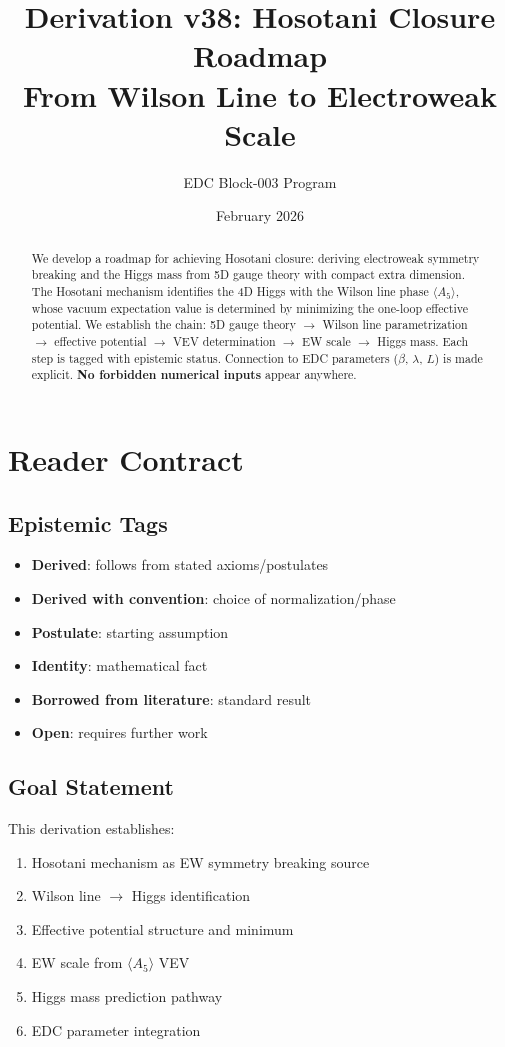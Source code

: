 \documentclass[11pt,a4paper]{article}
\title{\textbf{Derivation v38: Hosotani Closure Roadmap} \\[0.5em]
\large From Wilson Line to Electroweak Scale}
\author{EDC Block-003 Program}
\date{February 2026}
\newcommand{\tagD}{\textcolor{blue!70!black}{[D]}}
\newcommand{\tagDc}{\textcolor{blue!50!black}{[Dc]}}
\newcommand{\tagP}{\textcolor{green!50!black}{[P]}}
\newcommand{\tagI}{\textcolor{gray}{[I]}}
\newcommand{\tagBL}{\textcolor{purple}{[BL]}}
\newcommand{\tagOPEN}{\textcolor{red!70!black}{[OPEN]}}
\begin{document}
\maketitle

\begin{abstract}
We develop a roadmap for achieving Hosotani closure: deriving electroweak
symmetry breaking and the Higgs mass from 5D gauge theory with compact extra
dimension. The Hosotani mechanism identifies the 4D Higgs with the Wilson line
phase $\langle A_5 \rangle$, whose vacuum expectation value is determined by
minimizing the one-loop effective potential. We establish the chain:
5D gauge theory $\to$ Wilson line parametrization $\to$ effective potential
$\to$ VEV determination $\to$ EW scale $\to$ Higgs mass. Each step is tagged
with epistemic status. Connection to EDC parameters ($\beta$, $\lambda$, $L$)
is made explicit. \textbf{No forbidden numerical inputs} appear anywhere.
\end{abstract}

\tableofcontents
\newpage

\section{Reader Contract}

\subsection{Epistemic Tags}
\begin{itemize}[leftmargin=2cm]
    \item[\tagD] \textbf{Derived}: follows from stated axioms/postulates
    \item[\tagDc] \textbf{Derived with convention}: choice of normalization/phase
    \item[\tagP] \textbf{Postulate}: starting assumption
    \item[\tagI] \textbf{Identity}: mathematical fact
    \item[\tagBL] \textbf{Borrowed from literature}: standard result
    \item[\tagOPEN] \textbf{Open}: requires further work
\end{itemize}

\subsection{Goal Statement}
This derivation establishes:
\begin{enumerate}
    \item Hosotani mechanism as EW symmetry breaking source
    \item Wilson line $\to$ Higgs identification
    \item Effective potential structure and minimum
    \item EW scale from $\langle A_5 \rangle$ VEV
    \item Higgs mass prediction pathway
    \item EDC parameter integration
\end{enumerate}
\end{document}
